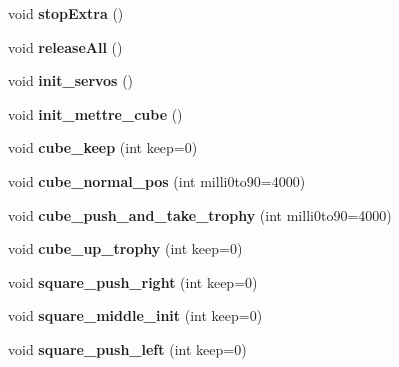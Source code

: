 \begin{DoxyCompactItemize}
void {\bfseries stop\+Extra} ()
\item 
\mbox{\label{classLegoEV3ActionsExtended_a7a576a640bb8a6090490bf0e9addba24}} 
void {\bfseries release\+All} ()
\item 
\mbox{\label{classLegoEV3ActionsExtended_a49a1b3687540cdf7bb715bf8cb915f99}} 
void {\bfseries init\+\_\+servos} ()
\item 
\mbox{\label{classLegoEV3ActionsExtended_adb4eb866502cd113f3fa1e92dfc5d0cb}} 
void {\bfseries init\+\_\+mettre\+\_\+cube} ()
\item 
\mbox{\label{classLegoEV3ActionsExtended_a57e33c8a03ab0665a5a34f897f6909b1}} 
void {\bfseries cube\+\_\+keep} (int keep=0)
\item 
\mbox{\label{classLegoEV3ActionsExtended_ac93a090edb4bcfafcc831738bb03d753}} 
void {\bfseries cube\+\_\+normal\+\_\+pos} (int milli0to90=4000)
\item 
\mbox{\label{classLegoEV3ActionsExtended_a7a04d30ac1bbe7f48aa22deb83b262d6}} 
void {\bfseries cube\+\_\+push\+\_\+and\+\_\+take\+\_\+trophy} (int milli0to90=4000)
\item 
\mbox{\label{classLegoEV3ActionsExtended_a035ceb13b7e0d6f0f54419465554f781}} 
void {\bfseries cube\+\_\+up\+\_\+trophy} (int keep=0)
\item 
\mbox{\label{classLegoEV3ActionsExtended_aa954057edf1c986e0415c48609632f3d}} 
void {\bfseries square\+\_\+push\+\_\+right} (int keep=0)
\item 
\mbox{\label{classLegoEV3ActionsExtended_a1b32d412ad96e2e8a7030090773203ae}} 
void {\bfseries square\+\_\+middle\+\_\+init} (int keep=0)
\item 
\mbox{\label{classLegoEV3ActionsExtended_abd2ec394481e22260e77f7b62474ff22}} 
void {\bfseries square\+\_\+push\+\_\+left} (int keep=0)
\item 

\end{DoxyCompactItemize}
